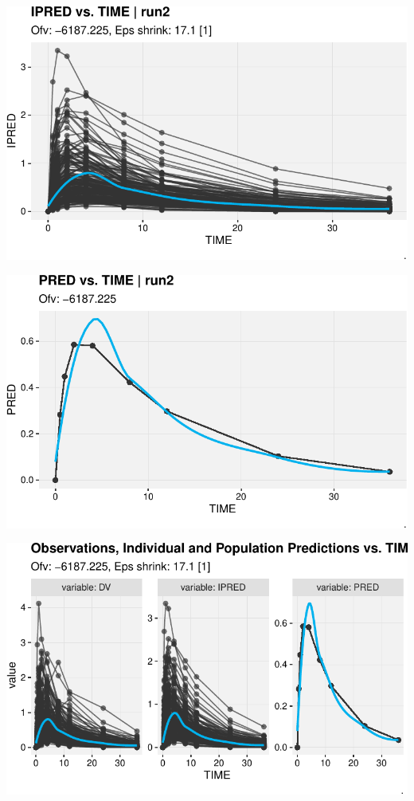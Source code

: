 \documentclass[
  letterpaper,
  toc=chapterentrywithdots,
  11pt,
  headings=small]{scrreprt}
\begin{document}
\includegraphics{sec/results_files/figure-pdf/unnamed-chunk-4-2.pdf}

\includegraphics{sec/results_files/figure-pdf/unnamed-chunk-4-3.pdf}

\includegraphics{sec/results_files/figure-pdf/unnamed-chunk-4-4.pdf}
\end{document}

